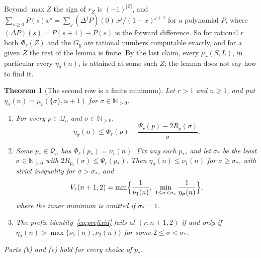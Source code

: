 \documentclass[11pt]{article}
\newtheorem{theorem}{Theorem}[section]
\newcommand{\N}{\mathbb N}
\begin{document}
Beyond $\max Z$ the sign of $r_Z$ is $(-1)^{|Z|}$, and
$\sum_{s\ge0}P(s)x^s=\sum_j(\Delta^jP)(0)\,x^j/(1-x)^{j+1}$ for a
polynomial $P$, where $(\Delta P)(s)=P(s+1)-P(s)$ is the forward
difference.  So for rational $r$ both $\Phi_r(Z)$ and the $G_y$ are
rational numbers computable exactly, and for a given $Z$ the test of the
lemma is finite.  By the last claim, every $\mu_r(S,L)$, in particular every
$\eta_\sigma(n)$, is attained at some such $Z$; the lemma does not say how
to find it.


\begin{theorem}[The second row is a finite minimum]\label{thm:secondrow}
Let $r>1$ and $n\ge1$, and put $\eta_\sigma(n)=\mu_r(\{\sigma\},n+1)$ for
$\sigma\in\N_{>0}$.
\begin{enumerate}
\item[(a)] For every $p\in\mathcal Q_n$ and $\sigma\in\N_{>0}$,
\[
  \eta_\sigma(n)\le\Phi_r(p)-\frac{\Psi_r(p)-2R_p(\sigma)}\sigma .
\]
\item[(b)] Some $p_*\in\mathcal Q_n$ has $\Phi_r(p_*)=\nu_1(n)$.  Fix any
such $p_*$, and let $\sigma_*$ be the least $\sigma\in\N_{>0}$ with
$2R_{p_*}(\sigma)\le\Psi_r(p_*)$.  Then $\eta_\sigma(n)\le\nu_1(n)$ for
$\sigma\ge\sigma_*$, with strict
inequality for $\sigma>\sigma_*$, and
\[
  V_r(n+1,2)=\min\Bigl\{\frac1{\nu_1(n)},\
  \min_{1\le\sigma<\sigma_*}\frac1{\eta_\sigma(n)}\Bigr\},
\]
where the inner minimum is omitted if $\sigma_*=1$.
\item[(c)] The prefix identity~\eqref{eq:prefixid} fails at $(r,n+1,2)$
if and only if $\eta_\sigma(n)>\max\{\nu_1(n),\nu_2(n)\}$ for some
$2\le\sigma<\sigma_*$.
\end{enumerate}
Parts (b) and (c) hold for every choice of $p_*$.
\end{theorem}
\end{document}
